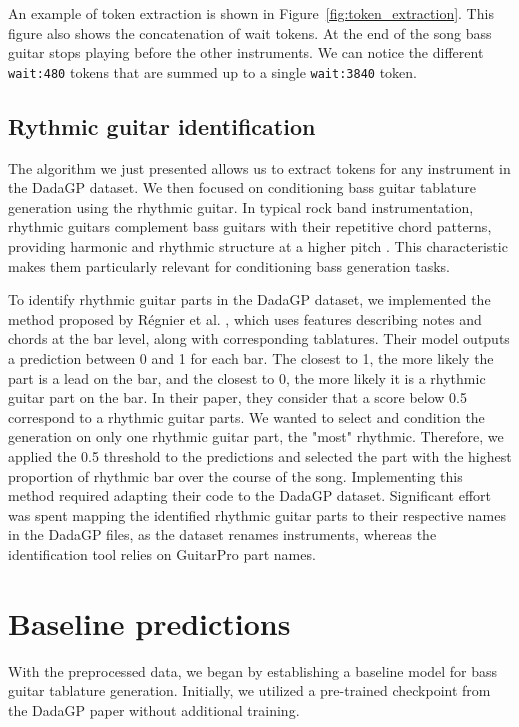 An example of token extraction is shown in Figure~\ref{fig:token_extraction}.
This figure also shows the concatenation of wait tokens.
At the end of the song bass guitar stops playing before the other instruments. We can notice the different \texttt{wait:480} tokens that are summed up to a single \texttt{wait:3840} token.


\subsection{Rythmic guitar identification}

The algorithm we just presented allows us to extract tokens for any instrument in the DadaGP dataset.
We then focused on conditioning bass guitar tablature generation using the rhythmic guitar.
In typical rock band instrumentation, rhythmic guitars complement bass guitars with their repetitive chord patterns, providing harmonic and rhythmic structure at a higher pitch \cite{regnier_identification_2021}.
This characteristic makes them particularly relevant for conditioning bass generation tasks.

To identify rhythmic guitar parts in the DadaGP dataset, we implemented the method proposed by Régnier et al. \cite{regnier_identification_2021},
which uses features describing notes and chords at the bar level, along with corresponding tablatures.
Their model outputs a prediction between 0 and 1 for each bar. The closest to 1, the more likely the part is a lead on the bar, and the closest to 0, the more likely it is a rhythmic guitar part on the bar.
In their paper, they consider that a score below 0.5 correspond to a rhythmic guitar parts. We wanted to select and condition the generation on only one rhythmic guitar part, the "most" rhythmic.
Therefore, we applied the 0.5 threshold to the predictions and selected the part with the highest proportion of rhythmic bar over the course of the song.
Implementing this method required adapting their code to the DadaGP dataset.
Significant effort was spent mapping the identified rhythmic guitar parts to their respective names in the DadaGP files, as the dataset renames instruments, whereas the identification tool relies on GuitarPro part names.

\section{Baseline predictions}

With the preprocessed data, we began by establishing a baseline model for bass guitar tablature generation.
Initially, we utilized a pre-trained checkpoint from the DadaGP paper \cite{sarmento_dadagp_2021} without additional training.

